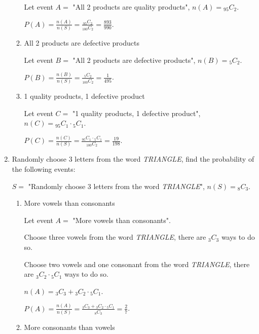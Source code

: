 \documentclass{report}
\newcommand\comb[2][^n]{{}_{#1}C_{#2}}
\begin{document}
\begin{multicols}{2}
\begin{enumerate}
\begin{enumerate}
                  Let event $A =$ "All 2 products are quality products", $n(A) = \comb[95]{2}$.

                  $P(A) = \frac{n(A)}{n(S)} = \frac{\comb[95]{2}}{\comb[100]{2}} = \frac{893}{990}$.

            \item All 2 products are defective products \sol{}

                  Let event $B =$ "All 2 products are defective products", $n(B) = \comb[5]{2}$.

                  $P(B) = \frac{n(B)}{n(S)} = \frac{\comb[5]{2}}{\comb[100]{2}} = \frac{1}{495}$.

            \item 1 quality products, 1 defective product
                  \sol{}

                  Let event $C =$ "1 quality products, 1 defective product", $n(C) = \comb[95]{1}
                    \cdot \comb[5]{1}$.

                  $P(C) = \frac{n(C)}{n(S)} = \frac{\comb[95]{1} \cdot \comb[5]{1}}{\comb[100]{2}} = \frac{19}{198}$.
          \end{enumerate}

    \item Randomly choose 3 letters from the word \textit{TRIANGLE}, find the probability
          of the following events: \sol{}

          $S =$ "Randomly choose 3 letters from the word \textit{TRIANGLE}", $n(S) = \comb[8]{3}$.

          \begin{enumerate}
            \item More vowels than consonants \sol{}

                  Let event $A =$ "More vowels than consonants".

                  Choose three vowels from the word \textit{TRIANGLE}, there are $\comb[3]{3}$
                  ways to do so.

                  Choose two vowels and one consonant from the word \textit{TRIANGLE}, there are
                  $\comb[3]{2} \cdot \comb[5]{1}$ ways to do so.

                  $n(A) = \comb[3]{3} + \comb[3]{2} \cdot \comb[5]{1}$.

                  $P(A) = \frac{n(A)}{n(S)} = \frac{\comb[3]{3} + \comb[3]{2} \cdot \comb[5]{1}}{\comb[8]{3}} = \frac{2}{7}$.

            \item More consonants than vowels \sol{}


\end{enumerate}
\end{enumerate}
\end{multicols}
\end{document}
